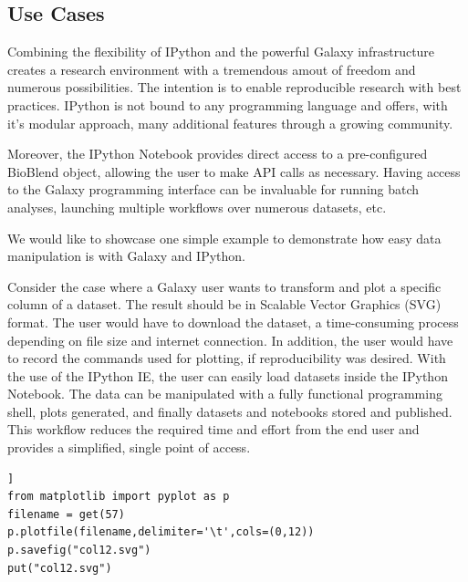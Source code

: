 \documentclass{bioinfo}
\begin{document}
\begin{methods}
\section{Use Cases}
Combining the flexibility of IPython and the powerful Galaxy infrastructure creates a research environment
with a tremendous amout of freedom and numerous possibilities. The intention is to enable
reproducible research with best practices. IPython is not bound to any programming language 
and offers, with it's modular approach, many additional features through a growing community.

Moreover, the IPython Notebook provides direct access to a pre-configured
BioBlend object, allowing the user to make API calls as necessary. Having access to the Galaxy programming interface
can be invaluable for running batch analyses, launching multiple workflows over numerous datasets, etc. 

We would like to showcase one simple example to demonstrate how easy data manipulation is with Galaxy and IPython. 

Consider the case where a Galaxy user wants to transform and plot a specific column of a dataset. 
The result should be in Scalable Vector Graphics (SVG) format. The user would have to download the dataset, 
a time-consuming process depending on file size and internet connection. 
In addition, the user would have to record the commands used for plotting, if reproducibility was desired.
With the use of the IPython IE, the user can easily load datasets inside the IPython Notebook.
The data can be manipulated with a fully functional programming shell, plots generated,
and finally datasets and notebooks stored and published.
This workflow reduces the required time and effort from the end user and provides a simplified, single point of access.

\begin{lstlisting}[frame=single,caption={Plotting example},label=code:import]]
from matplotlib import pyplot as p
filename = get(57)
p.plotfile(filename,delimiter='\t',cols=(0,12))
p.savefig("col12.svg")
put("col12.svg")
\end{lstlisting}


\end{methods}
\end{document}
